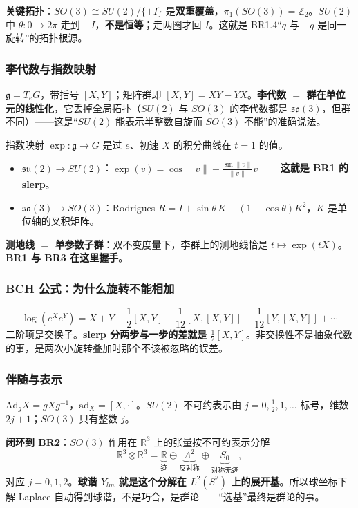 \textbf{关键拓扑}：$SO(3)\cong SU(2)/\{\pm I\}$ 是\textbf{双重覆盖}，$\pi_1(SO(3))=\mathbb{Z}_2$。$SU(2)$ 中 $\theta:0\to2\pi$ 走到 $-I$，\textbf{不是恒等}；走两圈才回 $I$。这就是 BR1.4“$q$ 与 $-q$ 是同一旋转”的拓扑根源。

\subsubsection{李代数与指数映射}

$\mathfrak{g}=T_eG$，带括号 $[X,Y]$；矩阵群即 $[X,Y]=XY-YX$。\textbf{李代数 $=$ 群在单位元的线性化}，它丢掉全局拓扑（$SU(2)$ 与 $SO(3)$ 的李代数都是 $\mathfrak{so}(3)$，但群不同）——这是“$SU(2)$ 能表示半整数自旋而 $SO(3)$ 不能”的准确说法。

指数映射 $\exp:\mathfrak{g}\to G$ 是过 $e$、初速 $X$ 的积分曲线在 $t=1$ 的值。

\begin{itemize}
  \item $\mathfrak{su}(2)\to SU(2)$：$\exp(v)=\cos\lVert v\rVert+\frac{\sin\lVert v\rVert}{\lVert v\rVert}v$ ——\textbf{这就是 BR1 的 slerp}。
  \item $\mathfrak{so}(3)\to SO(3)$：Rodrigues $R=I+\sin\theta\,K+(1-\cos\theta)K^2$，$K$ 是单位轴的叉积矩阵。
\end{itemize}

\textbf{测地线 $=$ 单参数子群}：双不变度量下，李群上的测地线恰是 $t\mapsto\exp(tX)$。\textbf{BR1 与 BR3 在这里握手}。

\subsubsection{BCH 公式：为什么旋转不能相加}

\[
\log(e^Xe^Y)=X+Y+\frac12[X,Y]+\frac{1}{12}[X,[X,Y]]-\frac{1}{12}[Y,[X,Y]]+\cdots
\]
二阶项是交换子。\textbf{slerp 分两步与一步的差就是 $\frac12[X,Y]$}。非交换性不是抽象代数的事，是两次小旋转叠加时那个不该被忽略的误差。

\subsubsection{伴随与表示}

$\mathrm{Ad}_gX=gXg^{-1}$，$\mathrm{ad}_X=[X,\cdot]$。$SU(2)$ 不可约表示由 $j=0,\frac12,1,\dots$ 标号，维数 $2j+1$；$SO(3)$ 只有整数 $j$。

\textbf{闭环到 BR2}：$SO(3)$ 作用在 $\mathbb{R}^3$ 上的张量按不可约表示分解
\[
\mathbb{R}^3\otimes\mathbb{R}^3=\underbrace{\mathbb{R}}_{\text{迹}}\oplus\underbrace{\Lambda^2}_{\text{反对称}}\oplus\underbrace{S_0}_{\text{对称无迹}},
\]
对应 $j=0,1,2$。\textbf{球谐 $Y_{lm}$ 就是这个分解在 $L^2(S^2)$ 上的展开基}。所以球坐标下解 Laplace 自动得到球谐，不是巧合，是群论——“选基”最终是群论的事。

